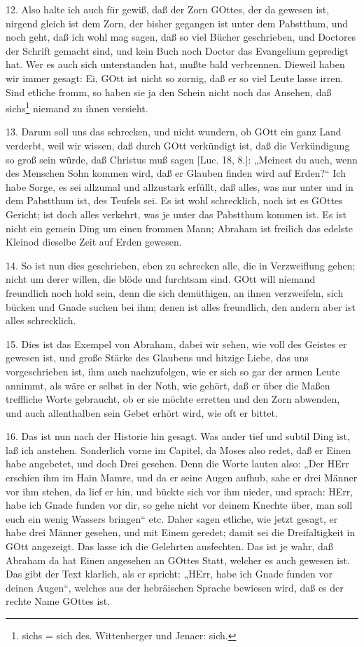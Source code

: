 12. Also halte ich auch für gewiß, daß der Zorn GOttes, der da gewesen ist, nirgend gleich ist dem Zorn, der bisher gegangen ist unter dem Pabstthum, und noch geht, daß ich wohl mag sagen, daß so viel Bücher geschrieben, und Doctores der Schrift gemacht sind, und kein Buch noch Doctor das Evangelium gepredigt hat. Wer es auch sich unterstanden hat, mußte bald verbrennen. Dieweil haben wir immer gesagt: Ei, GOtt ist nicht so zornig, daß er so viel Leute lasse irren. Sind etliche fromm, so haben sie ja den Schein nicht noch das Ansehen, daß sichs\footnote{sichs = sich des. Wittenberger und Jenaer: sich.} niemand zu ihnen versieht.

13. Darum soll uns das schrecken, und nicht wundern, ob GOtt ein ganz Land verderbt, weil wir wissen, daß durch GOtt verkündigt ist, daß die Verkündigung so groß sein würde, daß Christus muß sagen [Luc. 18, 8.]: „Meinest du auch, wenn des Menschen Sohn kommen wird, daß er Glauben finden wird auf Erden?“ Ich habe Sorge, es sei allzumal und allzustark erfüllt, daß alles, was nur unter und in dem Pabstthum ist, des Teufels sei. Es ist wohl schrecklich, noch ist es GOttes Gericht; ist doch alles verkehrt, was je unter das Pabstthum kommen ist. Es ist nicht ein gemein Ding um einen frommen Mann; Abraham ist freilich das edelste Kleinod dieselbe Zeit auf Erden gewesen.

14. So ist nun dies geschrieben, eben zu schrecken alle, die in Verzweiflung gehen; nicht um derer willen, die blöde und furchtsam sind. GOtt will niemand freundlich noch hold sein, denn die sich demüthigen, an ihnen verzweifeln, sich bücken und Gnade suchen bei ihm; denen ist alles freundlich, den andern aber ist alles schrecklich.

15. Dies ist das Exempel von Abraham, dabei wir sehen, wie voll des Geistes er gewesen ist, und große Stärke des Glaubens und hitzige Liebe, das uns vorgeschrieben ist, ihm auch nachzufolgen, wie er sich so gar der armen Leute annimmt, als wäre er selbst in der Noth, wie gehört, daß er über die Maßen treffliche Worte gebraucht, ob er sie möchte erretten und den Zorn abwenden, und auch allenthalben sein Gebet erhört wird, wie oft er bittet.

16. Das ist nun nach der Historie hin gesagt. Was ander tief und subtil Ding ist, laß ich anstehen. Sonderlich vorne im Capitel, da Moses also redet, daß er Einen habe angebetet, und doch Drei gesehen. Denn die Worte lauten also: „Der HErr erschien ihm im Hain Mamre, und da er seine Augen aufhub, sahe er drei Männer vor ihm stehen, da lief er hin, und bückte sich vor ihm nieder, und sprach: HErr, habe ich Gnade funden vor dir, so gehe nicht vor deinem Knechte über, man soll euch ein wenig Wassers bringen“ etc. Daher sagen etliche, wie jetzt gesagt, er habe drei Männer gesehen, und mit Einem geredet; damit sei die Dreifaltigkeit in GOtt angezeigt. Das lasse ich die Gelehrten ausfechten. Das ist je wahr, daß Abraham da hat Einen angesehen an GOttes Statt, welcher es auch gewesen ist. Das gibt der Text klarlich, als er spricht: „HErr, habe ich Gnade funden vor deinen Augen“, welches aus der hebräischen Sprache bewiesen wird, daß es der rechte Name GOttes ist.

